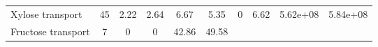 \documentclass[]{article}
\begin{document}
\begin{longtable}[]{@{}lccccccccc@{}}
\begin{minipage}[t]{0.07\columnwidth}
Xylose transport\strut
\end{minipage} & \begin{minipage}[t]{0.06\columnwidth}\centering\strut
45\strut
\end{minipage} & \begin{minipage}[t]{0.08\columnwidth}\centering\strut
2.22\strut
\end{minipage} & \begin{minipage}[t]{0.08\columnwidth}\centering\strut
2.64\strut
\end{minipage} & \begin{minipage}[t]{0.08\columnwidth}\centering\strut
6.67\strut
\end{minipage} & \begin{minipage}[t]{0.08\columnwidth}\centering\strut
5.35\strut
\end{minipage} & \begin{minipage}[t]{0.08\columnwidth}\centering\strut
0\strut
\end{minipage} & \begin{minipage}[t]{0.08\columnwidth}\centering\strut
6.62\strut
\end{minipage} & \begin{minipage}[t]{0.08\columnwidth}\centering\strut
5.62e+08\strut
\end{minipage} & \begin{minipage}[t]{0.08\columnwidth}\centering\strut
5.84e+08\strut
\end{minipage}\tabularnewline
\begin{minipage}[t]{0.07\columnwidth}\raggedright\strut
Fructose transport\strut
\end{minipage} & \begin{minipage}[t]{0.06\columnwidth}\centering\strut
7\strut
\end{minipage} & \begin{minipage}[t]{0.08\columnwidth}\centering\strut
0\strut
\end{minipage} & \begin{minipage}[t]{0.08\columnwidth}\centering\strut
0\strut
\end{minipage} & \begin{minipage}[t]{0.08\columnwidth}\centering\strut
42.86\strut
\end{minipage} & \begin{minipage}[t]{0.08\columnwidth}\centering\strut
49.58\strut
\end{minipage} & \begin{minipage}[t]{0.08\columnwidth}\centering\strut

\end{minipage}
\end{longtable}
\end{document}
